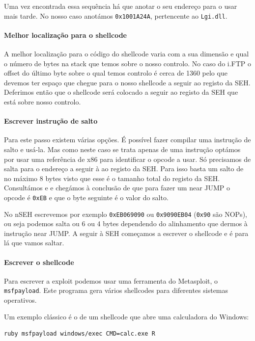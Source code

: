 \documentclass[a4paper]{article}
\begin{document}
Uma vez encontrada essa sequência há que anotar o seu endereço para o usar mais tarde. No nosso caso anotámos \texttt{0x1001A24A}, pertencente ao \texttt{Lgi.dll}.

\paragraph*{Melhor localização para o shellcode} A melhor localização para o código do shellcode varia com a sua dimensão e qual o número de bytes na stack que temos sobre o nosso controlo. No caso do i.FTP o offset do último byte sobre o qual temos controlo é cerca de 1360 pelo que devemos ter espaço que chegue para o nosso shellcode a seguir ao registo da SEH. Deferimos então que o shellcode será colocado a seguir ao registo da SEH que está sobre nosso controlo.

\paragraph*{Escrever instrução de salto} Para este passo existem várias opções. É possível fazer compilar uma instrução de salto e usá-la. Mas como neste caso se trata apenas de uma instrução optámos por usar uma referência de x86 para identificar o opcode a usar. Só precisamos de salta para o endereço a seguir à ao registo da SEH. Para isso basta um salto de no máximo 8 bytes visto que esse é o tamanho total do registo da SEH. Consultámos \cite{AMD64vol3_2013} e \cite{refx86asm} e chegámos à conclusão de que para fazer um near JUMP o opcode é \texttt{0xEB} e que o byte seguinte é o valor do salto.

No nSEH escrevemos por exemplo \texttt{0xEB069090} ou \texttt{0x9090EB04} (\texttt{0x90} são NOPs), ou seja podemos salta ou 6 ou 4 bytes dependendo do alinhamento que dermos à instrução near JUMP. A seguir à SEH começamos a escrever o shellcode e é para lá que vamos saltar.

\paragraph*{Escrever o shellcode} Para escrever a exploit podemos usar uma ferramenta do Metasploit, o \texttt{msfpayload}. Este programa gera vários shellcodes para diferentes sistemas operativos.

Um exemplo clássico é o de um shellcode que abre uma calculadora do Windows:

	\texttt{ruby msfpayload windows/exec CMD=calc.exe R}
\end{document}
